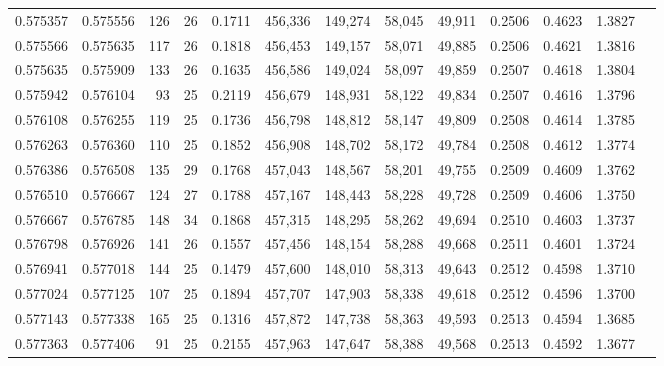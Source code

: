 \begin{tabular}{rrrrrrrrrrrrr}
0.575357 & 0.575556 &    126 &    26 &                                     0.1711 & 456,336 & 149,274 &  58,045 &  49,911 & 0.2506 & 0.4623 & 1.3827 \\
0.575566 & 0.575635 &    117 &    26 &                                     0.1818 & 456,453 & 149,157 &  58,071 &  49,885 & 0.2506 & 0.4621 & 1.3816 \\
0.575635 & 0.575909 &    133 &    26 &                                     0.1635 & 456,586 & 149,024 &  58,097 &  49,859 & 0.2507 & 0.4618 & 1.3804 \\
0.575942 & 0.576104 &     93 &    25 &                                     0.2119 & 456,679 & 148,931 &  58,122 &  49,834 & 0.2507 & 0.4616 & 1.3796 \\
0.576108 & 0.576255 &    119 &    25 &                                     0.1736 & 456,798 & 148,812 &  58,147 &  49,809 & 0.2508 & 0.4614 & 1.3785 \\
0.576263 & 0.576360 &    110 &    25 &                                     0.1852 & 456,908 & 148,702 &  58,172 &  49,784 & 0.2508 & 0.4612 & 1.3774 \\
0.576386 & 0.576508 &    135 &    29 &                                     0.1768 & 457,043 & 148,567 &  58,201 &  49,755 & 0.2509 & 0.4609 & 1.3762 \\
0.576510 & 0.576667 &    124 &    27 &                                     0.1788 & 457,167 & 148,443 &  58,228 &  49,728 & 0.2509 & 0.4606 & 1.3750 \\
0.576667 & 0.576785 &    148 &    34 &                                     0.1868 & 457,315 & 148,295 &  58,262 &  49,694 & 0.2510 & 0.4603 & 1.3737 \\
0.576798 & 0.576926 &    141 &    26 &                                     0.1557 & 457,456 & 148,154 &  58,288 &  49,668 & 0.2511 & 0.4601 & 1.3724 \\
0.576941 & 0.577018 &    144 &    25 &                                     0.1479 & 457,600 & 148,010 &  58,313 &  49,643 & 0.2512 & 0.4598 & 1.3710 \\
0.577024 & 0.577125 &    107 &    25 &                                     0.1894 & 457,707 & 147,903 &  58,338 &  49,618 & 0.2512 & 0.4596 & 1.3700 \\
0.577143 & 0.577338 &    165 &    25 &                                     0.1316 & 457,872 & 147,738 &  58,363 &  49,593 & 0.2513 & 0.4594 & 1.3685 \\
0.577363 & 0.577406 &     91 &    25 &                                     0.2155 & 457,963 & 147,647 &  58,388 &  49,568 & 0.2513 & 0.4592 & 1.3677 \\

\end{tabular}
